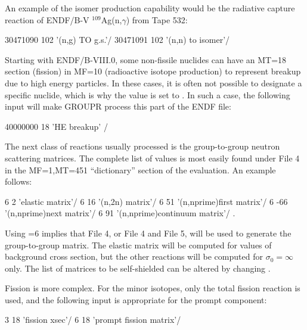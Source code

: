 \noindent
An example of the isomer production capability would be the
radiative capture reaction of ENDF/B-V $^{109}$Ag(n,$\gamma$)
from Tape 532:

\small
\begin{ccode}

   30471090 102 '(n,g) TO g.s.'/
   30471091 102 '(n,n) to isomer'/

\end{ccode}
\normalsize

\noindent
Starting with ENDF/B-VIII.0, some non-fissile nuclides can have an MT=18 section (fission)
in MF=10 (radioactive isotope production) to represent breakup due to high energy
particles. In these cases, it is often not possible to designate a specific nuclide,
which is why the  value is set to . In such a case, the
following input will make GROUPR process this part of the ENDF file:

\small
\begin{ccode}

   40000000  18 'HE breakup' /

\end{ccode}
\normalsize

The next class of reactions usually processed is the group-to-group
neutron scattering matrices.  The complete list of  values is
most easily found under File 4 in the MF=1,MT=451 ``dictionary''
section of the evaluation.  An example follows:

\small
\begin{ccode}

   6   2 'elastic matrix'/
   6  16 '(n,2n) matrix'/
   6  51 '(n,nprime)first matrix'/
   6 -66 '(n,nprime)next matrix'/
   6  91 '(n,nprime)continuum matrix'/  .

\end{ccode}
\normalsize

\noindent
Using =6 implies that File 4, or File 4 and File 5, will
be used to generate the group-to-group matrix.  The elastic matrix will
be computed for  values of background cross section, but
the other reactions will be computed for $\sigma_0{=}\infty$ only.  The
list of matrices to be self-shielded can be altered by changing
.

Fission is more complex.  For the minor isotopes, only
the total fission reaction is used, and the following input is appropriate
for the prompt component:

\small
\begin{ccode}

   3 18 'fission xsec'/
   6 18 'prompt fission matrix'/

\end{ccode}
\normalsize


